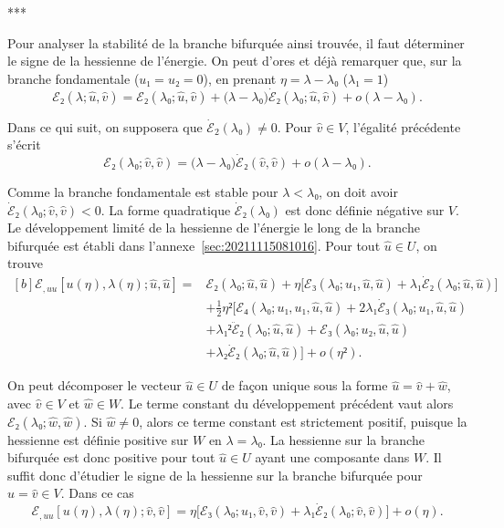 \documentclass[12pt, final]{amsart}
\begin{document}
\begin{center}
  ***
\end{center}

Pour analyser la stabilité de la branche bifurquée ainsi trouvée, il faut
déterminer le signe de la hessienne de l'énergie. On peut d'ores et déjà
remarquer que, sur la branche fondamentale (\(u₁=u₂=0\)), en prenant \(η=λ-λ₀\)
(\(λ₁=1\))
\begin{equation}
  ℰ₂(λ; \hat{u}, \hat{v})
  =ℰ₂(λ₀; \hat{u}, \hat{v})+\bigl(λ-λ₀\bigr)\dot{ℰ}₂(λ₀; \hat{u}, \hat{v})+o(λ-λ₀).
\end{equation}

Dans ce qui suit, on supposera que \(\dot{ℰ}_2(λ₀)≠0\). Pour \(\hat{v}∈V\),
l'égalité précédente s'écrit
\begin{equation}
  ℰ₂(λ₀; \hat{v}, \hat{v})=\bigl(λ-λ₀\bigr)\dot{ℰ}₂(\hat{v}, \hat{v})+o(λ-λ₀).
\end{equation}

Comme la branche fondamentale est stable pour \(λ<λ₀\), on doit avoir
\(\dot{ℰ}₂(λ₀; \hat{v}, \hat{v})<0\). La forme quadratique \(\dot{ℰ}₂(λ₀)\) est
donc définie négative sur \(V\). Le développement limité de la hessienne de
l'énergie le long de la branche bifurquée est établi dans
l'annexe~\ref{sec:20211115081016}. Pour tout \(\hat{u}∈U\), on trouve
\begin{equation}
  \label{eq:20211115082025}
  \begin{aligned}[b]
    ℰ_{,uu}[u(η), λ(η); \hat{u}, \hat{u}]
    ={}&ℰ₂(λ₀; \hat{u}, \hat{u})+η\bigl[ℰ₃(λ₀; u₁, \hat{u}, \hat{u})
    +λ₁\dot{ℰ}₂(λ₀; \hat{u}, \hat{u})\bigr]\\
    &+\tfrac12η²\bigl[ℰ₄(λ₀; u₁, u₁, \hat{u}, \hat{u})
    +2λ₁\dot{ℰ}₃(λ₀; u₁, \hat{u}, \hat{u})\\
    &+λ₁²\ddot{ℰ}₂(λ₀; \hat{u}, \hat{u})
    +ℰ₃(λ₀; u₂, \hat{u}, \hat{u})\\
    &+λ₂\dot{ℰ}₂(λ₀; \hat{u}, \hat{u})\bigr]
    +o(η²).
  \end{aligned}
\end{equation}

On peut décomposer le vecteur \(\hat{u}∈U\) de façon unique sous la forme
\(\hat{u}=\hat{v}+\hat{w}\), avec \(\hat{v}∈V\) et \(\hat{w}∈W\). Le terme
constant du développement précédent vaut alors \(ℰ₂(λ₀; \hat{w}, \hat{w})\). Si
\(\hat{w}≠0\), alors ce terme constant est strictement positif, puisque la
hessienne est définie positive sur \(W\) en \(λ=λ₀\). La hessienne sur la
branche bifurquée est donc positive pour tout \(\hat{u}∈U\) ayant une
composante dans \(W\). Il suffit donc d'étudier le signe de la hessienne sur la
branche bifurquée pour \(\hat{u}=\hat{v}∈V\). Dans ce cas
\begin{equation}
  ℰ_{,uu}[u(η), λ(η); \hat{v}, \hat{v}]
  =η\bigl[ℰ₃(λ₀; u₁, \hat{v}, \hat{v})
  +λ₁\dot{ℰ}₂(λ₀; \hat{v}, \hat{v})\bigr]+o(η).
\end{equation}
\end{document}
